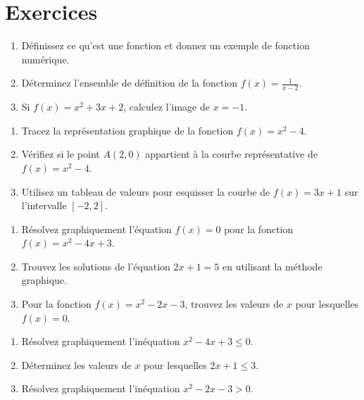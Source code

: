 \documentclass[12pt,a4paper,french]{book}
\begin{document}
\newpage

\section{Exercices}

\begin{exocor}
\begin{enumerate}
    \item Définissez ce qu'est une fonction et donnez un exemple de fonction numérique.
    \item Déterminez l'ensemble de définition de la fonction \( f(x) = \frac{1}{x-2} \).
    \item Si \( f(x) = x^2 + 3x + 2 \), calculez l'image de \( x = -1 \).
\end{enumerate}
\end{exocor}

\begin{exocor}
\begin{enumerate}
    \item Tracez la représentation graphique de la fonction \( f(x) = x^2 - 4 \).
    \item Vérifiez si le point \( A(2,0) \) appartient à la courbe représentative de \( f(x) = x^2 - 4 \).
    \item Utilisez un tableau de valeurs pour esquisser la courbe de \( f(x) = 3x + 1 \) sur l'intervalle \( [-2, 2] \).
\end{enumerate}
\end{exocor}

\begin{exocor}
\begin{enumerate}
    \item Résolvez graphiquement l'équation \( f(x) = 0 \) pour la fonction \( f(x) = x^2 - 4x + 3 \).
    \item Trouvez les solutions de l'équation \( 2x + 1 = 5 \) en utilisant la méthode graphique.
    \item Pour la fonction \( f(x) = x^2 - 2x - 3 \), trouvez les valeurs de \( x \) pour lesquelles \( f(x) = 0 \).
\end{enumerate}
\end{exocor}

\begin{exocor}
\begin{enumerate}
    \item Résolvez graphiquement l'inéquation \( x^2 - 4x + 3 \leq 0 \).
    \item Déterminez les valeurs de \( x \) pour lesquelles \( 2x + 1 \leq 3 \).
    \item Résolvez graphiquement l'inéquation \( x^2 - 2x - 3 > 0 \).
\end{enumerate}
\end{exocor}
\end{document}
